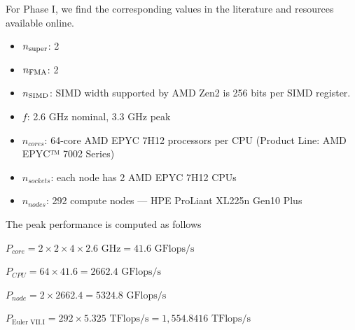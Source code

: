 \documentclass[unicode,11pt,a4paper,oneside,numbers=endperiod,openany]{scrartcl}
\begin{document}
For Phase I, we find the corresponding values in the literature and resources available online.
\begin{itemize}
    \item $n_{\tiny{\textrm{super}}}$: 2 \cite{uops-info}
    \item $n_{\tiny{\textrm{FMA}}}$: 2 \cite{uops-info}
    \item $n_{\tiny{\textrm{SIMD}}}$: SIMD width supported by AMD Zen2 is 256 bits per SIMD register. 
     \cite{hager2021amd}
    \item $f$: 2.6 GHz nominal, 3.3 GHz peak \cite{euler-ethz}
    \item $n_{cores}$: 64-core AMD EPYC 7H12 processors per CPU (Product Line: AMD EPYC™ 7002 Series) \cite{amd-epyc-7H12}
    \item $n_{sockets}$: each node has 2 AMD EPYC 7H12 CPUs \cite{euler-ethz}
    \item $n_{nodes}$: 292 compute nodes — HPE ProLiant XL225n Gen10 Plus \cite{euler-ethz}
\end{itemize}
The peak performance is computed as follows
\begin{center}
    $P_{core}  = 2 \times 2 \times 4 \times 2.6 \textrm{ GHz}= 41.6 \textrm{ GFlops/s}$
\end{center}
\begin{center}
    $P_{CPU} = 64 \times 41.6 = 2662.4 \textrm{ GFlops/s}$
\end{center}
\begin{center}
    $P_{node} = 2 \times 2662.4 = 5324.8 \textrm{ GFlops/s}$
\end{center}
\begin{center}
    $\boxed{P_{\textrm{Euler VII.I}} = 292 \times 5.325 \textrm{ TFlops/s}  = 1,554.8416 \textrm{ TFlops/s}}$
\end{center}
\end{document}
